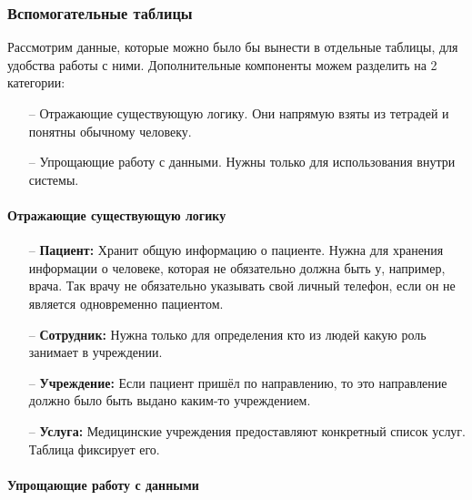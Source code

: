 \documentclass[a4paper,article]{article}
\begin{document}
\begin{sloppypar}
    \subsubsection{Вспомогательные таблицы}\label{Проектирование БД. Вспомогательные компоненты}

    Рассмотрим данные, которые можно было бы вынести в отдельные таблицы, для удобства работы с ними. Дополнительные компоненты можем разделить на 2 категории:

    \begin{itemize}[nolistsep]
        \item[--] Отражающие существующую логику. Они напрямую взяты из тетрадей и понятны обычному человеку.
        \item[--] Упрощающие работу с данными. Нужны только для использования внутри системы.
    \end{itemize}

    \paragraph{Отражающие существующую логику}\label{Проектирование БД. Вспомогательные компоненты. Отражающие логику}

    \begin{itemize}[nolistsep]
        \item[--] \textbf{Пациент:} Хранит общую информацию о пациенте. Нужна для хранения информации о человеке, которая не обязательно должна быть у, например, врача. Так врачу не обязательно указывать свой личный телефон, если он не является одновременно пациентом.
        \item[--] \textbf{Сотрудник:} Нужна только для определения кто из людей какую роль занимает в учреждении.
        \item[--] \textbf{Учреждение:} Если пациент пришёл по направлению, то это направление должно было быть выдано каким-то учреждением.
        \item[--] \textbf{Услуга:} Медицинские учреждения предоставляют конкретный список услуг. Таблица фиксирует его.
    \end{itemize}

    \paragraph{Упрощающие работу с данными}\label{Проектирование БД. Вспомогательные компоненты. Упрощающие работу с данными}


\end{sloppypar}
\end{document}
